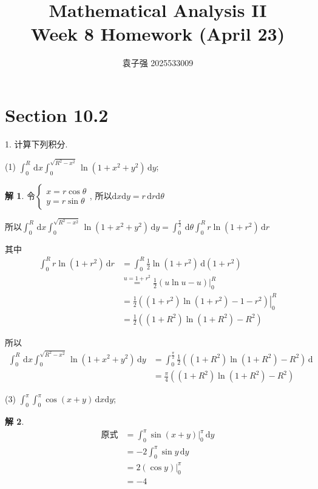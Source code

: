 \documentclass[a4paper,12pt]{article}
\title{Mathematical Analysis II\\Week 8 Homework (April 23)}
\author{袁子强\hspace{1cm} 2025533009}
\theoremstyle{definition}
\newtheorem*{sol}{解}
\begin{document}
\maketitle

\section*{Section 10.2}

1. 计算下列积分.

(1) $\displaystyle\int_{0}^{R}\,\mathrm{d}x \int_{0}^{\sqrt{R^2 - x^2}} \ln(1 + x^2 + y^2)\,\mathrm{d}y$;
\begin{sol}
    令$\begin{cases}
            x=r\cos\theta \\
            y=r\sin\theta
        \end{cases}$, 所以$\mathrm{d}x\mathrm{d}y=r\,\mathrm{d}r\mathrm{d}\theta$

    所以$\int_{0}^{R}\,\mathrm{d}x \int_{0}^{\sqrt{R^2 - x^2}} \ln(1 + x^2 + y^2)\,\mathrm{d}y=\int_0^{\frac{\pi}{2}}\,\mathrm{d}\theta\int_0^Rr\ln(1+r^2)\,\mathrm{d}r$

    其中
    \begin{align*}
        \int_0^Rr\ln(1+r^2)\,\mathrm{d}r
         & =\int_0^R\frac{1}{2}\ln(1+r^2)\,\mathrm{d}(1+r^2)            \\
         & \overset{u=1+r^2}{=}\frac{1}{2}\left.(u\ln u-u)\right|_{0}^R \\
         & =\frac{1}{2}\left.((1+r^2)\ln(1+r^2)-1-r^2)\right|_{0}^R     \\
         & =\frac{1}{2}((1+R^2)\ln(1+R^2)-R^2)
    \end{align*}

    所以
    \begin{align*}
        \int_{0}^{R}\,\mathrm{d}x \int_{0}^{\sqrt{R^2 - x^2}} \ln(1 + x^2 + y^2)\,\mathrm{d}y
         & =\int_0^{\frac{\pi}{2}}\frac{1}{2}((1+R^2)\ln(1+R^2)-R^2)\,\mathrm{d} \\
         & =\frac{\pi}{4}((1+R^2)\ln(1+R^2)-R^2)
    \end{align*}
\end{sol}
(3) $\displaystyle\int_{0}^{\pi} \int_{0}^{\pi} \cos(x + y)\,\mathrm{d}x\mathrm{d}y$;
\begin{sol}
    \begin{align*}
        \text{原式}
         & =\int_{0}^{\pi}\left.\sin(x+y)\right|_0^{\pi}\,\mathrm{d}y \\
         & =-2\int_{0}^{\pi}\sin y\,\mathrm{d}y                       \\
         & =2\left.(\cos y)\right|_0^{\pi}                            \\
         & =-4
    \end{align*}
\end{sol}
\end{document}
